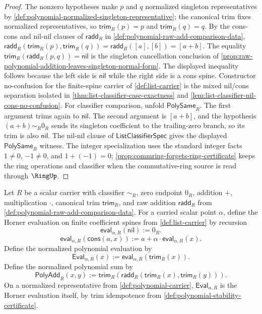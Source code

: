 \begin{proof}
The nonzero hypotheses make $p$ and $q$ normalized singleton representatives by \autoref{def:polynomial-normalized-singleton-representative}; the canonical trim fixes normalized representatives, so $\mathsf{trim}_R(p)=p$ and $\mathsf{trim}_R(q)=q$.
By the cons-cons and nil-nil clauses of $\mathsf{radd}_R$ in \autoref{def:polynomial-raw-add-comparison-data}, $\mathsf{radd}_R(\mathsf{trim}_R(p),\mathsf{trim}_R(q))=\mathsf{radd}_R([a],[b])=[a+b]$.
The equality $\mathsf{trim}_R(\mathsf{radd}_R(p,q))=\mathsf{nil}$ is the singleton cancellation conclusion of \autoref{prop:raw-polynomial-addition-leaves-singleton-normal-form}.
The displayed inequality follows because the left side is $\mathsf{nil}$ while the right side is a cons spine. Constructor no-confusion for the finite-spine carrier of \autoref{def:list-carrier} is the mixed nil/cons separation isolated in \autoref{thm:list-classifier-case-exactness} and \autoref{lem:list-classifier-nil-cons-no-confusion}.
For classifier comparison, unfold $\mathsf{PolySame}_R$. The first argument trims again to $\mathsf{nil}$. The second argument is $[a+b]$, and the hypothesis $(a+b)\sim_R0_R$ sends its singleton coefficient to the trailing-zero branch, so its trim is also $\mathsf{nil}$. The nil-nil clause of $\mathsf{ListClassifierSpec}$ gives the displayed $\mathsf{PolySame}_R$ witness.
The integer specialization uses the standard integer facts $1\ne0$, $-1\ne0$, and $1+(-1)=0$; \autoref{prop:commring-forgets-ring-certificate} keeps the ring operations and classifier when the commutative-ring source is read through $\RingUp$.
\end{proof}

\begin{definition}
\label{def:polynomial-horner-evaluation}
Let $R$ be a scalar carrier with classifier $\sim_R$, zero endpoint $0_R$, addition $+$, multiplication $\cdot$, canonical trim $\mathsf{trim}_R$, and raw addition $\mathsf{radd}_R$ from \autoref{def:polynomial-raw-add-comparison-data}. For a carried scalar point $\alpha$, define the Horner evaluation on finite coefficient spines from \autoref{def:list-carrier} by recursion
$$
\mathsf{eval}_{\alpha,R}(\mathsf{nil}):=0_R.
$$
$$
\mathsf{eval}_{\alpha,R}(\mathsf{cons}(a,x)):=a+\alpha\cdot\mathsf{eval}_{\alpha,R}(x).
$$
Define the normalized polynomial evaluation by
$$
\mathsf{Eval}_{\alpha,R}(x):=\mathsf{eval}_{\alpha,R}(\mathsf{trim}_R(x)).
$$
Define the normalized polynomial sum by
$$
\mathsf{PolyAdd}_R(x,y):=\mathsf{trim}_R(\mathsf{radd}_R(\mathsf{trim}_R(x),\mathsf{trim}_R(y))).
$$
On a normalized representative from \autoref{def:polynomial-carrier}, $\mathsf{Eval}_{\alpha,R}$ is the Horner evaluation itself, by trim idempotence from \autoref{def:polynomial-stability-certificate}.
\end{definition}

